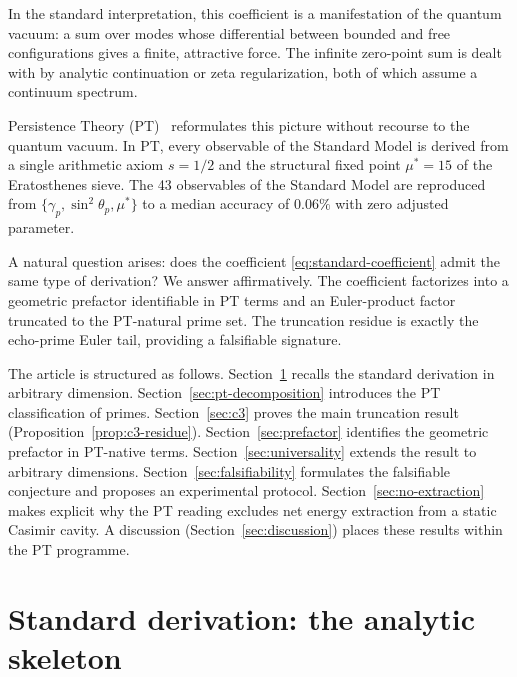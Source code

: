\documentclass[11pt,a4paper]{article}
\begin{document}
In the standard interpretation, this coefficient is a manifestation of the quantum vacuum: a
sum over modes whose differential between bounded and free configurations gives a finite,
attractive force. The infinite zero-point sum is dealt with by analytic continuation or zeta
regularization, both of which assume a continuum spectrum.

Persistence Theory (PT)~\cite{Senez2026} reformulates this picture without recourse to the
quantum vacuum. In PT, every observable of the Standard Model is derived from a single
arithmetic axiom $s = 1/2$ and the structural fixed point $\mu^{*} = 15$ of the Eratosthenes
sieve. The 43 observables of the Standard Model are reproduced from
$\{\gamma_{p}, \sin^{2}\theta_{p}, \mu^{*}\}$ to a median accuracy of $0.06\%$ with zero adjusted
parameter.

A natural question arises: does the coefficient \eqref{eq:standard-coefficient} admit the same
type of derivation? We answer affirmatively. The coefficient factorizes into a geometric
prefactor identifiable in PT terms and an Euler-product factor truncated to the PT-natural
prime set. The truncation residue is exactly the echo-prime Euler tail, providing a falsifiable
signature.

The article is structured as follows. Section~\ref{sec:standard} recalls the standard derivation
in arbitrary dimension. Section~\ref{sec:pt-decomposition} introduces the PT classification of
primes. Section~\ref{sec:c3} proves the main truncation result (Proposition~\ref{prop:c3-residue}).
Section~\ref{sec:prefactor} identifies the geometric prefactor in PT-native terms.
Section~\ref{sec:universality} extends the result to arbitrary dimensions.
Section~\ref{sec:falsifiability} formulates the falsifiable conjecture and proposes an
experimental protocol. Section~\ref{sec:no-extraction} makes explicit why the PT reading
excludes net energy extraction from a static Casimir cavity. A discussion
(Section~\ref{sec:discussion}) places these results within the PT programme.

\section{Standard derivation: the analytic skeleton}
\label{sec:standard}
\end{document}
